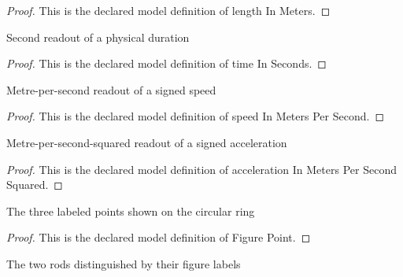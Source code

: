 \begin{proof}
  This is the declared model definition of length In Meters.
\end{proof}
\begin{definition}
  \label{def:physics:phyx-mini-0675:phyxminiproblems-problemphyxmini0675-timeinseconds}
  Second readout of a physical duration
\end{definition}
\begin{proof}
  This is the declared model definition of time In Seconds.
\end{proof}
\begin{definition}
  \label{def:physics:phyx-mini-0675:phyxminiproblems-problemphyxmini0675-speedinmeterspersecond}
  Metre-per-second readout of a signed speed
\end{definition}
\begin{proof}
  This is the declared model definition of speed In Meters Per Second.
\end{proof}
\begin{definition}
  \label{def:physics:phyx-mini-0675:phyxminiproblems-problemphyxmini0675-accelerationinmeterspersecondsquared}
  Metre-per-second-squared readout of a signed acceleration
\end{definition}
\begin{proof}
  This is the declared model definition of acceleration In Meters Per Second Squared.
\end{proof}
\begin{definition}
  \label{def:physics:phyx-mini-0675:phyxminiproblems-problemphyxmini0675-figurepoint}
  The three labeled points shown on the circular ring
\end{definition}
\begin{proof}
  This is the declared model definition of Figure Point.
\end{proof}
\begin{definition}[Rod]
  \label{def:physics:phyx-mini-0675:phyxminiproblems-problemphyxmini0675-rod}
  The two rods distinguished by their figure labels
\end{definition}
